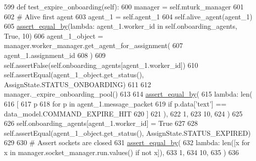 \begin{DoxyCode}
599     \textcolor{keyword}{def }test\_expire\_onboarding(self):
600         manager = self.mturk\_manager
601 
602         \textcolor{comment}{# Alive first agent}
603         agent\_1 = self.agent\_1
604         self.alive\_agent(agent\_1)
605         \hyperlink{namespaceparlai_1_1mturk_1_1core_1_1test_1_1test__full__system_a0b463246d35658a2e422010f13dcf819}{assert\_equal\_by}(\textcolor{keyword}{lambda}: agent\_1.worker\_id \textcolor{keywordflow}{in} self.onboarding\_agents, \textcolor{keyword}{True}, 10)
606         agent\_1\_object = manager.worker\_manager.get\_agent\_for\_assignment(
607             agent\_1.assignment\_id
608         )
609         self.assertFalse(self.onboarding\_agents[agent\_1.worker\_id])
610         self.assertEqual(agent\_1\_object.get\_status(), AssignState.STATUS\_ONBOARDING)
611 
612         manager.\_expire\_onboarding\_pool()
613 
614         \hyperlink{namespaceparlai_1_1mturk_1_1core_1_1test_1_1test__full__system_a0b463246d35658a2e422010f13dcf819}{assert\_equal\_by}(
615             \textcolor{keyword}{lambda}: len(
616                 [
617                     p
618                     \textcolor{keywordflow}{for} p \textcolor{keywordflow}{in} agent\_1.message\_packet
619                     \textcolor{keywordflow}{if} p.data[\textcolor{stringliteral}{'text'}] == data\_model.COMMAND\_EXPIRE\_HIT
620                 ]
621             ),
622             1,
623             10,
624         )
625 
626         self.onboarding\_agents[agent\_1.worker\_id] = \textcolor{keyword}{True}
627 
628         self.assertEqual(agent\_1\_object.get\_status(), AssignState.STATUS\_EXPIRED)
629 
630         \textcolor{comment}{# Assert sockets are closed}
631         \hyperlink{namespaceparlai_1_1mturk_1_1core_1_1test_1_1test__full__system_a0b463246d35658a2e422010f13dcf819}{assert\_equal\_by}(
632             \textcolor{keyword}{lambda}: len([x \textcolor{keywordflow}{for} x \textcolor{keywordflow}{in} manager.socket\_manager.run.values() \textcolor{keywordflow}{if} \textcolor{keywordflow}{not} x]),
633             1,
634             10,
635         )
636 
\end{DoxyCode}
\mbox{\label{classparlai_1_1mturk_1_1core_1_1test_1_1test__full__system_1_1TestMTurkManagerWorkflows_a65ea28ad81308473c22580178fa57a90}} 
